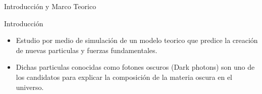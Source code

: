 \begin{frame}{}
    \begin{center}
        \LARGE Introducción y Marco Teorico
    \end{center}
\end{frame}


\begin{frame}{Introducción}
\begin{itemize}
\item Estudio por medio de simulaci\'on de un modelo teorico que predice la creaci\'on de nuevas particulas y fuerzas fundamentales.
\item Dichas particulas conocidas como fotones oscuros (Dark photons) son uno de los candidatos para explicar la composici\'on de la materia oscura en el universo.
\end{itemize}
\end{frame}

